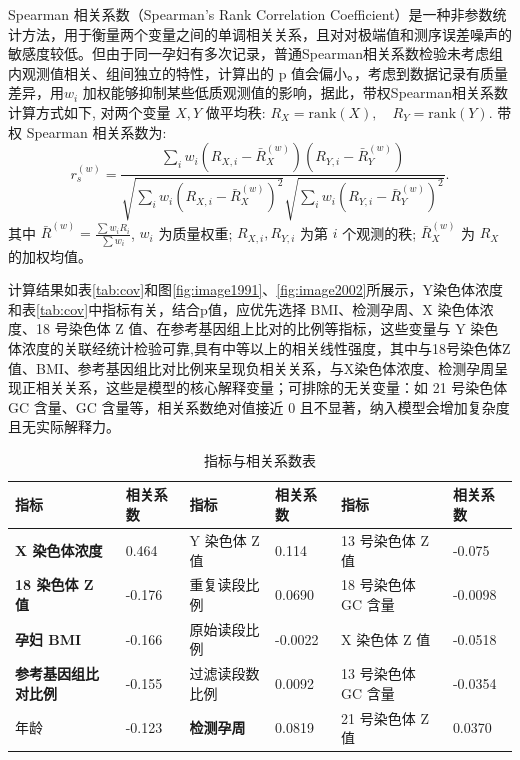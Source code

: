 Spearman 相关系数（Spearman's Rank Correlation Coefficient）是一种非参数统计方法，用于衡量两个变量之间的单调相关关系，且对对极端值和测序误差噪声的敏感度较低。但由于同一孕妇有多次记录，普通Spearman相关系数检验未考虑组内观测值相关、组间独立的特性，计算出的 p 值会偏小。，考虑到数据记录有质量差异，用$w_i$ 加权能够抑制某些低质观测值的影响，据此，带权Spearman相关系数计算方式如下, 对两个变量 \( X, Y \) 做平均秩:
\(R_X = \text{rank}(X), \quad R_Y = \text{rank}(Y).\) 带权 Spearman 相关系数为:
\begin{equation}
\label{equ:spearman}
r_s^{(w)} = \frac{\sum_i w_i \left(R_{X,i} - \bar{R}_X^{(w)}\right)\left(R_{Y,i} - \bar{R}_Y^{(w)}\right)}{\sqrt{\sum_i w_i \left(R_{X,i} - \bar{R}_X^{(w)}\right)^2} \sqrt{\sum_i w_i \left(R_{Y,i} - \bar{R}_Y^{(w)}\right)^2}}.
\end{equation}
其中 \( \bar{R}^{(w)} = \frac{\sum w_i R_i}{\sum w_i} \), \( w_i \) 为质量权重; \( R_{X,i}, R_{Y,i} \) 为第 \( i \) 个观测的秩; \( \bar{R}_X^{(w)} \) 为 \( R_X \) 的加权均值。

计算结果如表\ref{tab:cov}和图\ref{fig:image1991}、\ref{fig:image2002}所展示，Y染色体浓度和表\ref{tab:cov}中指标有关，结合p值，应优先选择 BMI、检测孕周、X 染色体浓度、18 号染色体 Z 值、在参考基因组上比对的比例等指标，这些变量与 Y 染色体浓度的关联经统计检验可靠,具有中等以上的相关线性强度，其中与18号染色体Z值、BMI、参考基因组比对比例来呈现负相关关系，与X染色体浓度、检测孕周呈现正相关关系，这些是模型的核心解释变量；可排除的无关变量：如 21 号染色体 GC 含量、GC 含量等，相关系数绝对值接近 0 且不显著，纳入模型会增加复杂度且无实际解释力。

\begin{table}[htbp]
  \centering
  \caption{指标与相关系数表}
  \begin{tabular}{llllll}
    \toprule
    指标 & 相关系数 & 指标 & 相关系数 & 指标 & 相关系数 \\
    \midrule
    \textbf{X 染色体浓度} & 0.464 & Y 染色体 Z 值 & 0.114 & 13 号染色体 Z 值 & -0.075 \\
    \textbf{18 染色体 Z 值} & -0.176 & 重复读段比例 & 0.0690 & 18 号染色体 GC 含量 & -0.0098 \\
    \textbf{孕妇 BMI} & -0.166 & 原始读段比例 & -0.0022 & X 染色体 Z 值 & -0.0518 \\
    \textbf{参考基因组比对比例} & -0.155 & 过滤读段数比例 & 0.0092 & 13 号染色体 GC 含量 & -0.0354 \\
    年龄 & -0.123 & \textbf{检测孕周} & 0.0819 & 21 号染色体 Z 值 & 0.0370 \\
    \bottomrule
  \end{tabular}
\end{table}

